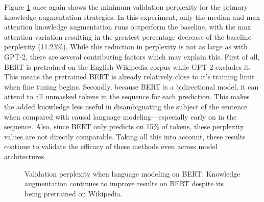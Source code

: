 \documentclass[phd,electronic,oneside,twosidetoc,letterpaper,chaptercenter,parttop,lof]{byumsphd}
\begin{document}
Figure \ref{fig:bert} once again shows the minimum validation perplexity for the primary knowledge augmentation strategies.  In this experiment, only the median and max attention knowledge augmentation runs outperform the baseline, with the max attention variation resulting in the greatest percentage decrease of the baseline perplexity (11.23\%). While this reduction in perplexity is not as large as with GPT-2, there are several contributing factors which may explain this.
First of all, BERT is pretrained on the English Wikipedia corpus \cite{devlin2018bert} while GPT-2 excludes it.
This means the pretrained BERT is already relatively close to it's training limit when fine tuning begins.
Secondly, because BERT is a bidirectional model, it can attend to all unmasked tokens in the sequence for each prediction.
This makes the added knowledge less useful in disambiguating the subject of the sentence when compared with causal language modeling---especially early on in the sequence.
Also, since BERT only predicts on 15\% of tokens, these perplexity values are not directly comparable.
Taking all this into account, these results continue to validate the efficacy of these methods even across model architectures.

\begin{figure}
\centering
{}  
    \caption[Bert validation perplexity]{
        Validation perplexity when language modeling on BERT.
        Knowledge augmentation continues to improve results on BERT despite its being pretrained on Wikipedia.
    }
    \label{fig:bert}
\end{figure}
\end{document}
